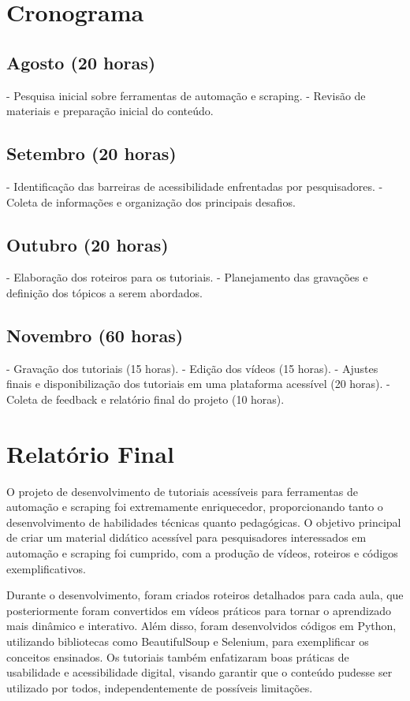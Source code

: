 \documentclass{article}
\begin{document}
\section*{Cronograma}
\subsection*{Agosto (20 horas)}
- Pesquisa inicial sobre ferramentas de automação e scraping.
- Revisão de materiais e preparação inicial do conteúdo.

\subsection*{Setembro (20 horas)}
- Identificação das barreiras de acessibilidade enfrentadas por pesquisadores.
- Coleta de informações e organização dos principais desafios.

\subsection*{Outubro (20 horas)}
- Elaboração dos roteiros para os tutoriais.
- Planejamento das gravações e definição dos tópicos a serem abordados.

\subsection*{Novembro (60 horas)}
- Gravação dos tutoriais (15 horas).
- Edição dos vídeos (15 horas).
- Ajustes finais e disponibilização dos tutoriais em uma plataforma acessível (20 horas).
- Coleta de feedback e relatório final do projeto (10 horas).

\section*{Relatório Final}
O projeto de desenvolvimento de tutoriais acessíveis para ferramentas de automação e scraping foi extremamente enriquecedor, proporcionando tanto o desenvolvimento de habilidades técnicas quanto pedagógicas. O objetivo principal de criar um material didático acessível para pesquisadores interessados em automação e scraping foi cumprido, com a produção de vídeos, roteiros e códigos exemplificativos.

Durante o desenvolvimento, foram criados roteiros detalhados para cada aula, que posteriormente foram convertidos em vídeos práticos para tornar o aprendizado mais dinâmico e interativo. Além disso, foram desenvolvidos códigos em Python, utilizando bibliotecas como BeautifulSoup e Selenium, para exemplificar os conceitos ensinados. Os tutoriais também enfatizaram boas práticas de usabilidade e acessibilidade digital, visando garantir que o conteúdo pudesse ser utilizado por todos, independentemente de possíveis limitações.
\end{document}
